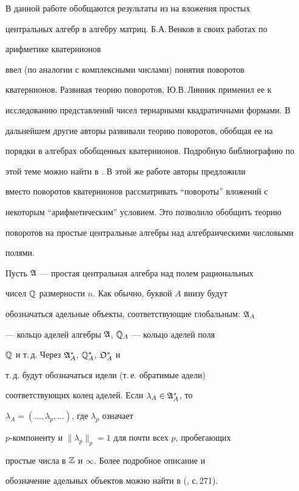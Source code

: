  


В данной работе обобщаются результаты из \cite{1} на вложения простых 


центральных алгебр в алгебру матриц. Б.А.\,Венков в своих работах по 


арифметике кватернионов


ввел (по аналогии с комплексными числами) понятия поворотов 


кватернионов. Развивая теорию поворотов, Ю.В.\,Линник применил ее к 


исследованию представлений чисел тернарными квадратичными формами. В 


дальнейшем другие авторы развивали теорию поворотов, обобщая ее на 


порядки в алгебрах обобщенных кватернионов. Подробную библиографию по 


этой теме можно найти в \cite{2}. В этой же работе авторы предложили 


вместо поворотов кватернионов рассматривать ``повороты'' вложений с 


некоторым ``арифметическим'' условием. Это позволило обобщить теорию 


поворотов на простые центральные алгебры над алгебраическими числовыми 


полями. 


 


Пусть $\frak A$ --- простая центральная алгебра над полем рациональных 


чисел $\Bbb Q$ размерности $n$. Как обычно, буквой $A$ внизу будут 


обозначаться адельные объекты, соответствующие глобальным: $\frak A_A$ 


--- кольцо аделей алгебры $\frak A$, $\Bbb Q_A$ --- кольцо аделей поля 


$\Bbb Q$ и т.\,д. Через $\frak A^*_A$, $\Bbb Q^*_A$, $\frak O^*_A$ и 


т.\,д. будут обозначаться идели (т.\,е. обратимые адели) 


соответствующих колец аделей. Если $\lambda_A\in\frak A^*_A$, то 


$\lambda_A=(\dotsc,\lambda_p,\dotsc)$, где $\lambda_p$ означает 


$p$-компоненту и $\|\lambda_p\|_p=1$ для почти всех $p$, пробегающих 


простые числа в $\Bbb Z$ и $\infty$. Более подробное описание и 


обозначение адельных объектов можно найти в (\cite{3}, с.\,271). 


